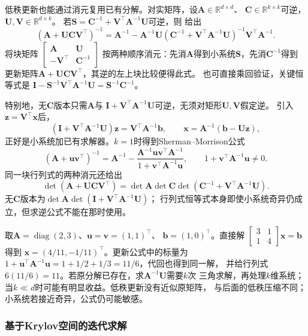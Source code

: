 低秩更新也能通过消元复用已有分解。对实矩阵，设$\bm A\in\mathbb R^{d\times d}$、
$\bm C\in\mathbb R^{k\times k}$可逆，$\bm U,\bm V\in\mathbb R^{d\times k}$。
若$\bm S=\bm C^{-1}+\bm V^\top\bm A^{-1}\bm U$可逆，则
给出
\begin{equation}
 (\bm A+\bm U\bm C\bm V^\top)^{-1}
 =\bm A^{-1}-\bm A^{-1}\bm U
 (\bm C^{-1}+\bm V^\top\bm A^{-1}\bm U)^{-1}
 \bm V^\top\bm A^{-1}.
 \label{eq:matrix-analysis-woodbury}
\end{equation}
将块矩阵
$\left[\begin{smallmatrix}\bm A&\bm U\\-\bm V^\top&\bm C^{-1}\end{smallmatrix}\right]$
按两种顺序消元：先消$\bm A$得到小系统$\bm S$，先消$\bm C^{-1}$得到
更新矩阵$\bm A+\bm U\bm C\bm V^\top$，其逆的左上块比较便得此式。
也可直接乘回验证，关键恒等式是
$\bm I-\bm S^{-1}\bm V^\top\bm A^{-1}\bm U=\bm S^{-1}\bm C^{-1}$。

特别地，无$\bm C$版本只需$\bm A$与
$\bm I+\bm V^\top\bm A^{-1}\bm U$可逆，无须对矩形$\bm U,\bm V$假定逆。
引入$\bm z=\bm V^\top\bm x$后，
\[
 (\bm I+\bm V^\top\bm A^{-1}\bm U)\bm z
 =\bm V^\top\bm A^{-1}\bm b,\qquad
 \bm x=\bm A^{-1}(\bm b-\bm U\bm z),
\]
正好是小系统加已有求解器。$k=1$时得到Sherman--Morrison公式
\[
 (\bm A+\bm u\bm v^\top)^{-1}
 =\bm A^{-1}
 -\frac{\bm A^{-1}\bm u\bm v^\top\bm A^{-1}}
        {1+\bm v^\top\bm A^{-1}\bm u},
 \qquad1+\bm v^\top\bm A^{-1}\bm u\neq0.
\]
同一块行列式的两种消元还给出
\[
 \det(\bm A+\bm U\bm C\bm V^\top)
 =\det\bm A\det\bm C
  \det(\bm C^{-1}+\bm V^\top\bm A^{-1}\bm U).
\]
无$\bm C$版本为$\det\bm A\det(\bm I+\bm V^\top\bm A^{-1}\bm U)$；
行列式恒等式本身即使小系统奇异仍成立，但求逆公式不能在那时使用。

取$\bm A=\operatorname{diag}(2,3)$、$\bm u=\bm v=(1,1)^\top$、
$\bm b=(1,0)^\top$。直接解
$\left[\begin{smallmatrix}3&1\\1&4\end{smallmatrix}\right]\bm x=\bm b$得到
$\bm x=(4/11,-1/11)^\top$。更新公式中的标量为
$1+\bm u^\top\bm A^{-1}\bm u=1+1/2+1/3=11/6$，代回也得到同一解，
并给行列式$6(11/6)=11$。若原分解已存在，求$\bm A^{-1}\bm U$需要$k$次
三角求解，再处理$k$维系统；当$k\ll d$时可能有明显收益。低秩更新没有近似原矩阵，
与后面的低秩压缩不同；小系统若接近奇异，公式仍可能敏感。

\subsubsection{基于Krylov空间的迭代求解}
\label{sec:ch06-iterative-solvers}
\label{sec:ch06-conjugate-gradient}
\label{sec:ch06-gmres}

